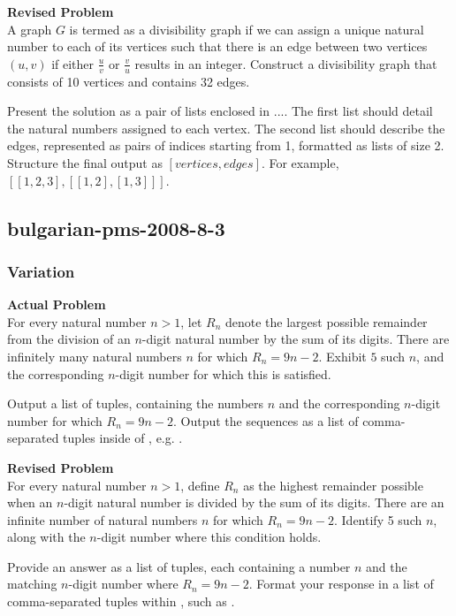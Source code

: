 \textbf{Revised Problem}\\
A graph $G$ is termed as a divisibility graph if we can assign a unique natural number to each of its vertices such that there is an edge between two vertices $(u, v)$ if either $\frac{u}{v}$ or $\frac{v}{u}$ results in an integer. Construct a divisibility graph that consists of 10 vertices and contains 32 edges.

Present the solution as a pair of lists enclosed in $\boxed{...}$. The first list should detail the natural numbers assigned to each vertex. The second list should describe the edges, represented as pairs of indices starting from 1, formatted as lists of size 2. Structure the final output as $\boxed{[vertices, edges]}$. For example, $\boxed{[[1,2,3], [[1, 2], [1, 3]]]}$.

\subsection{bulgarian-pms-2008-8-3}
\subsubsection{Variation}
\textbf{Actual Problem}\\
For every natural number $n > 1$, let $R_{n}$ denote the largest possible remainder from the division of an $n$-digit natural number by the sum of its digits. There are infinitely many natural numbers $n$ for which $R_{n} = 9 n - 2$. Exhibit $5$ such $n$, and the corresponding $n$-digit number for which this is satisfied.

Output a list of tuples, containing the numbers $n$ and the corresponding $n$-digit number for which $R_{n} = 9 n - 2$. Output the sequences as a list of comma-separated tuples inside of \boxed, e.g. .

\textbf{Revised Problem}\\
For every natural number \( n > 1 \), define \( R_{n} \) as the highest remainder possible when an \( n \)-digit natural number is divided by the sum of its digits. There are an infinite number of natural numbers \( n \) for which \( R_{n} = 9n - 2 \). Identify 5 such \( n \), along with the \( n \)-digit number where this condition holds.

Provide an answer as a list of tuples, each containing a number \( n \) and the matching \( n \)-digit number where \( R_{n} = 9n - 2 \). Format your response in a list of comma-separated tuples within \boxed, such as .

